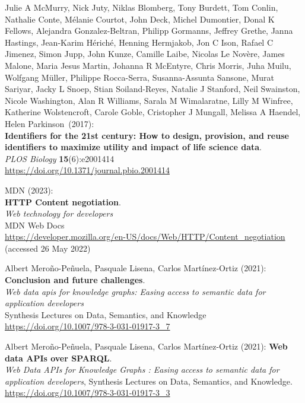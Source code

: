 \begin{thebibliography}{9}
Julie A McMurry, Nick Juty, Niklas Blomberg, Tony
Burdett, Tom Conlin, Nathalie Conte, Mélanie Courtot, John Deck, Michel
Dumontier, Donal K Fellows, Alejandra Gonzalez-Beltran, Philipp
Gormanns, Jeffrey Grethe, Janna Hastings, Jean-Karim Hériché, Henning
Hermjakob, Jon C Ison, Rafael C Jimenez, Simon Jupp, John Kunze, Camille
Laibe, Nicolas Le Novère, James Malone, Maria Jesus Martin, Johanna R
McEntyre, Chris Morris, Juha Muilu, Wolfgang Müller, Philippe
Rocca-Serra, Susanna-Assunta Sansone, Murat Sariyar, Jacky L Snoep,
Stian Soiland-Reyes, Natalie J Stanford, Neil Swainston, Nicole
Washington, Alan R Williams, Sarala M Wimalaratne, Lilly M Winfree,
Katherine Wolstencroft, Carole Goble, Cristopher J Mungall, Melissa A
Haendel, Helen Parkinson~(2017):\\
\textbf{Identifiers for the 21st century: How to design, provision, and
reuse identifiers to maximize utility and impact of life science
data}.\\
\emph{PLOS Biology} \textbf{15}(6):e2001414\\
\url{https://doi.org/10.1371/journal.pbio.2001414}

MDN (2023): \\
\textbf{HTTP Content negotiation}.\\
\emph{Web technology for developers}\\
MDN Web Docs \\
\url{https://developer.mozilla.org/en-US/docs/Web/HTTP/Content_negotiation}
(accessed 26 May 2022)

Albert Meroño-Peñuela, Pasquale Lisena, Carlos Martínez-Ortiz (2021):
\textbf{Conclusion and future challenges}. \\
\emph{Web data apis for knowledge graphs: {Easing} access to semantic data for application
developers} \\
Synthesis Lectures on Data, Semantics, and Knowledge\\
\url{https://doi.org/10.1007/978-3-031-01917-3_7}

Albert Meroño-Peñuela, Pasquale Lisena, Carlos Martínez-Ortiz (2021):
\textbf{Web data APIs over {SPARQL}}. \\
\emph{Web Data APIs for Knowledge Graphs : Easing access to semantic data for application developers}, 
Synthesis Lectures on Data, Semantics, and Knowledge.\\
\url{https://doi.org/10.1007/978-3-031-01917-3_3}


\end{thebibliography}
